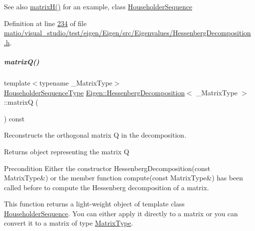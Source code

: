 \begin{DoxySeeAlso}{See also}
\hyperlink{group___eigenvalues___module_a8e781d2e22a2304647bcf0ae913cc8ea}{matrix\+H()} for an example, class \hyperlink{group___householder___module_class_eigen_1_1_householder_sequence}{Householder\+Sequence} 
\end{DoxySeeAlso}


Definition at line \hyperlink{matio_2visual__studio_2test_2eigen_2_eigen_2src_2_eigenvalues_2_hessenberg_decomposition_8h_source_l00234}{234} of file \hyperlink{matio_2visual__studio_2test_2eigen_2_eigen_2src_2_eigenvalues_2_hessenberg_decomposition_8h_source}{matio/visual\+\_\+studio/test/eigen/\+Eigen/src/\+Eigenvalues/\+Hessenberg\+Decomposition.\+h}.

\mbox{\label{group___eigenvalues___module_a346441e4902a58d43d698ac3da6ff791}} 
\subparagraph{\texorpdfstring{matrix\+Q()}{matrixQ()}\hspace{0.1cm}{\footnotesize\ttfamily [2/2]}}
{\footnotesize\ttfamily template$<$typename \+\_\+\+Matrix\+Type$>$ \\
\hyperlink{group___eigenvalues___module_a7c1188cd5d8f550c8941df75a50a7d08}{Householder\+Sequence\+Type} \hyperlink{group___eigenvalues___module_class_eigen_1_1_hessenberg_decomposition}{Eigen\+::\+Hessenberg\+Decomposition}$<$ \+\_\+\+Matrix\+Type $>$\+::matrixQ (\begin{DoxyParamCaption}{ }\end{DoxyParamCaption}) const\hspace{0.3cm}{\ttfamily [inline]}}



Reconstructs the orthogonal matrix Q in the decomposition. 

\begin{DoxyReturn}{Returns}
object representing the matrix Q
\end{DoxyReturn}
\begin{DoxyPrecond}{Precondition}
Either the constructor Hessenberg\+Decomposition(const Matrix\+Type\&) or the member function compute(const Matrix\+Type\&) has been called before to compute the Hessenberg decomposition of a matrix.
\end{DoxyPrecond}
This function returns a light-\/weight object of template class \hyperlink{group___householder___module_class_eigen_1_1_householder_sequence}{Householder\+Sequence}. You can either apply it directly to a matrix or you can convert it to a matrix of type \hyperlink{group___eigenvalues___module_a93a611350a7db9d1da18f2c828ecea9f}{Matrix\+Type}.

